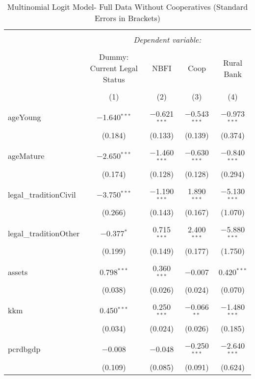 \documentclass[a4paper,nobind]{templates/ociamthesis}
\begin{document}
\begin{table}[!htbp] \centering 
  \caption{Multinomial Logit Model- Full Data Without Cooperatives (Standard Errors in Brackets)} 
  \label{} 
\footnotesize 
\begin{tabular}{@{\extracolsep{5pt}}lcccc} 
\\[-1.8ex]\hline 
\hline \\[-1.8ex] 
 & \multicolumn{4}{c}{\textit{Dependent variable:}} \\ 
\cline{2-5} 
\\[-1.8ex] & Dummy: Current Legal Status & NBFI & Coop & Rural Bank \\ 
\\[-1.8ex] & (1) & (2) & (3) & (4)\\ 
\hline \\[-1.8ex] 
 ageYoung & $-$1.640$^{***}$ & $-$0.621$^{***}$ & $-$0.543$^{***}$ & $-$0.973$^{***}$ \\ 
  & (0.184) & (0.133) & (0.139) & (0.374) \\ 
  & & & & \\ 
 ageMature & $-$2.650$^{***}$ & $-$1.460$^{***}$ & $-$0.630$^{***}$ & $-$0.840$^{***}$ \\ 
  & (0.174) & (0.128) & (0.128) & (0.294) \\ 
  & & & & \\ 
 legal\_traditionCivil & $-$3.750$^{***}$ & $-$1.190$^{***}$ & 1.890$^{***}$ & $-$5.130$^{***}$ \\ 
  & (0.266) & (0.143) & (0.167) & (1.070) \\ 
  & & & & \\ 
 legal\_traditionOther & $-$0.377$^{*}$ & 0.715$^{***}$ & 2.400$^{***}$ & $-$5.880$^{***}$ \\ 
  & (0.199) & (0.149) & (0.177) & (1.750) \\ 
  & & & & \\ 
 assets & 0.798$^{***}$ & 0.360$^{***}$ & $-$0.007 & 0.420$^{***}$ \\ 
  & (0.038) & (0.026) & (0.024) & (0.070) \\ 
  & & & & \\ 
 kkm & 0.450$^{***}$ & 0.250$^{***}$ & $-$0.066$^{**}$ & $-$1.480$^{***}$ \\ 
  & (0.034) & (0.024) & (0.026) & (0.185) \\ 
  & & & & \\ 
 pcrdbgdp & $-$0.008 & $-$0.048 & $-$0.250$^{***}$ & $-$2.640$^{***}$ \\ 
  & (0.109) & (0.085) & (0.091) & (0.624) \\ 

\end{tabular}
\end{table}
\end{document}
